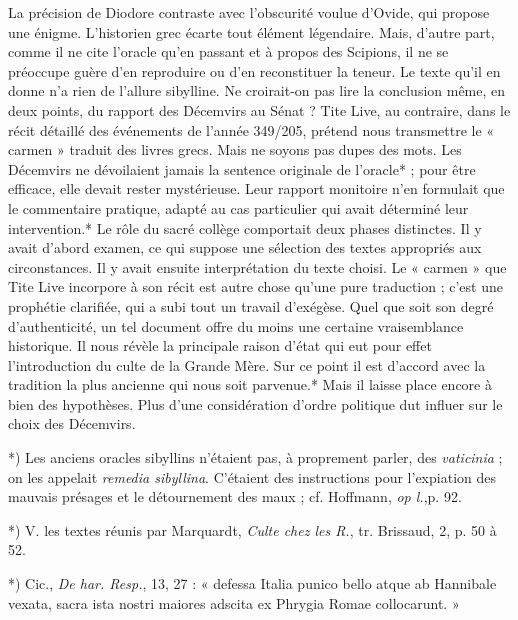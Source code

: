 \documentclass[a4paper, 11pt, oneside, polutonikogreek, french]{article}
\begin{document}
La précision de Diodore contraste avec l'obscurité voulue d'Ovide, qui propose une énigme. L'historien grec écarte tout élément légendaire. Mais, d'autre part, comme il ne cite l'oracle qu'en passant et à propos des Scipions, il ne se préoccupe guère d'en reproduire ou d'en reconstituer la teneur. Le texte qu'il en donne n'a rien de l'allure sibylline. Ne croirait-on pas lire la conclusion même, en deux points, du rapport des Décemvirs au Sénat ? Tite Live, au contraire, dans le récit détaillé des événements de l'année 349/205, prétend nous transmettre le « carmen » traduit des livres grecs. Mais ne soyons pas dupes des mots. Les Décemvirs ne dévoilaient jamais la sentence originale de l'oracle* ; pour être efficace, elle devait rester mystérieuse. Leur rapport monitoire n'en formulait que le commentaire pratique, adapté au cas particulier qui avait déterminé leur intervention.* Le rôle du sacré collège comportait deux phases distinctes. Il y avait d'abord examen, ce qui suppose une sélection des textes appropriés aux circonstances. Il y avait ensuite interprétation du texte choisi. Le « carmen » que Tite Live incorpore à son récit est autre chose qu'une pure traduction ; c'est une prophétie clarifiée, qui a subi tout un travail d'exégèse. Quel que soit son degré d'authenticité, un tel document offre du moins une certaine vraisemblance historique. Il nous révèle la principale raison d'état qui eut pour effet l'introduction du culte de la Grande Mère. Sur ce point il est d'accord avec la tradition la plus ancienne qui nous soit parvenue.* Mais il laisse place encore à bien des hypothèses. Plus d'une considération d'ordre politique dut influer sur le choix des Décemvirs.

*) Les anciens oracles sibyllins n'étaient pas, à proprement parler, des \emph{vaticinia} ; on les appelait \emph{remedia sibyllina}. C'étaient des instructions pour l'expiation des mauvais présages et le détournement des maux ; cf. Hoffmann, \emph{op l.},p. 92.

*) V. les textes réunis par Marquardt, \emph{Culte chez les R.}, tr. Brissaud, 2, p. 50 à 52.

*) Cic., \emph{De har. Resp.}, 13, 27 : « defessa Italia punico bello atque ab Hannibale vexata, sacra ista nostri maiores adscita ex Phrygia Romae collocarunt. »
\end{document}
